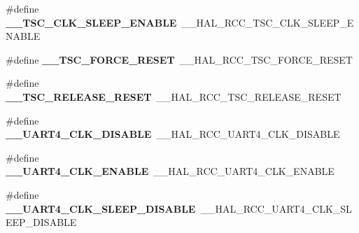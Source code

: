 \begin{DoxyCompactItemize}
\item 
\#define {\bfseries \+\_\+\+\_\+\+T\+S\+C\+\_\+\+C\+L\+K\+\_\+\+S\+L\+E\+E\+P\+\_\+\+E\+N\+A\+B\+LE}~\+\_\+\+\_\+\+H\+A\+L\+\_\+\+R\+C\+C\+\_\+\+T\+S\+C\+\_\+\+C\+L\+K\+\_\+\+S\+L\+E\+E\+P\+\_\+\+E\+N\+A\+B\+LE\hypertarget{group___h_a_l___r_c_c___aliased_ga7b5f8a9297ad0b44ae5a8f138b3ec36e}{}\label{group___h_a_l___r_c_c___aliased_ga7b5f8a9297ad0b44ae5a8f138b3ec36e}

\item 
\#define {\bfseries \+\_\+\+\_\+\+T\+S\+C\+\_\+\+F\+O\+R\+C\+E\+\_\+\+R\+E\+S\+ET}~\+\_\+\+\_\+\+H\+A\+L\+\_\+\+R\+C\+C\+\_\+\+T\+S\+C\+\_\+\+F\+O\+R\+C\+E\+\_\+\+R\+E\+S\+ET\hypertarget{group___h_a_l___r_c_c___aliased_gacce146f2929b942c64a8e5aec1f21e3c}{}\label{group___h_a_l___r_c_c___aliased_gacce146f2929b942c64a8e5aec1f21e3c}

\item 
\#define {\bfseries \+\_\+\+\_\+\+T\+S\+C\+\_\+\+R\+E\+L\+E\+A\+S\+E\+\_\+\+R\+E\+S\+ET}~\+\_\+\+\_\+\+H\+A\+L\+\_\+\+R\+C\+C\+\_\+\+T\+S\+C\+\_\+\+R\+E\+L\+E\+A\+S\+E\+\_\+\+R\+E\+S\+ET\hypertarget{group___h_a_l___r_c_c___aliased_ga43df0cf8789c4ad5c6b75de0238cbb5b}{}\label{group___h_a_l___r_c_c___aliased_ga43df0cf8789c4ad5c6b75de0238cbb5b}

\item 
\#define {\bfseries \+\_\+\+\_\+\+U\+A\+R\+T4\+\_\+\+C\+L\+K\+\_\+\+D\+I\+S\+A\+B\+LE}~\+\_\+\+\_\+\+H\+A\+L\+\_\+\+R\+C\+C\+\_\+\+U\+A\+R\+T4\+\_\+\+C\+L\+K\+\_\+\+D\+I\+S\+A\+B\+LE\hypertarget{group___h_a_l___r_c_c___aliased_ga9cafabe9be45837925e0381029311698}{}\label{group___h_a_l___r_c_c___aliased_ga9cafabe9be45837925e0381029311698}

\item 
\#define {\bfseries \+\_\+\+\_\+\+U\+A\+R\+T4\+\_\+\+C\+L\+K\+\_\+\+E\+N\+A\+B\+LE}~\+\_\+\+\_\+\+H\+A\+L\+\_\+\+R\+C\+C\+\_\+\+U\+A\+R\+T4\+\_\+\+C\+L\+K\+\_\+\+E\+N\+A\+B\+LE\hypertarget{group___h_a_l___r_c_c___aliased_gaa7d235e31461e6946366a789a12d2a58}{}\label{group___h_a_l___r_c_c___aliased_gaa7d235e31461e6946366a789a12d2a58}

\item 
\#define {\bfseries \+\_\+\+\_\+\+U\+A\+R\+T4\+\_\+\+C\+L\+K\+\_\+\+S\+L\+E\+E\+P\+\_\+\+D\+I\+S\+A\+B\+LE}~\+\_\+\+\_\+\+H\+A\+L\+\_\+\+R\+C\+C\+\_\+\+U\+A\+R\+T4\+\_\+\+C\+L\+K\+\_\+\+S\+L\+E\+E\+P\+\_\+\+D\+I\+S\+A\+B\+LE\hypertarget{group___h_a_l___r_c_c___aliased_ga6eabcf2af5aee392a64df6c80f653d8c}{}\label{group___h_a_l___r_c_c___aliased_ga6eabcf2af5aee392a64df6c80f653d8c}


\end{DoxyCompactItemize}
